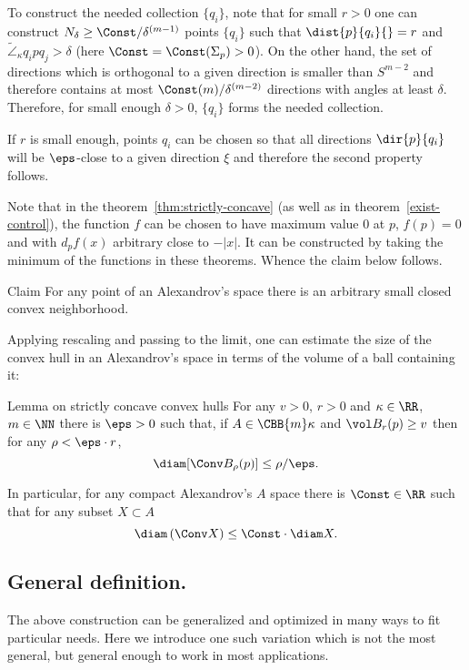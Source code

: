 To construct the needed collection $\{q_i\}$, note that for small $r>0$ one can
construct $N_\delta\ge \Const/\delta^{(m-1)}$ points $\{q_i\}$ such that $\dist{p}{q_i}{}=r$
and $\tilde\angle_\kappa q_i p q_j>\delta$ (here $\Const=\Const(\Sigma_p)>0$).
On the other hand, the set of directions which is orthogonal to a given direction
is smaller than $S^{m-2}$ and therefore contains at most
$\Const(m)/\delta^{(m-2)}$ directions with angles at least $\delta$. 
Therefore, for small enough $\delta>0$, $\{q_i\}$ forms the needed collection.

If $r$ is small enough, points $q_i$ can be chosen so that all directions
$\dir{p}{q_i}$ will be $\eps$-close to a given direction $\xi$ and
therefore the second property follows.
\qeds

Note that in the theorem~\ref{thm:strictly-concave} (as well as in
theorem~\ref{exist-control}), the function $f$ can be chosen to have maximum value $0$ at $p$,
$f(p)=0$ and with $d_p f(x)$ arbitrary close to $-|x|$.
It can be constructed by taking the minimum of the functions in these theorems. Whence the claim below follows.


\begin{thm}{Claim}\label{cor:convex-nbhd}
For any point of an Alexandrov's space there is an arbitrary small closed convex
neighborhood.
\end{thm}

Applying rescaling and passing to the limit, 
one can estimate the size of the convex
hull in an Alexandrov's space in terms of the volume of a ball containing it:

\begin{thm}{Lemma on strictly concave convex hulls
\cite[4.3]{perelman-petrunin:extremal}}
For any $v>0$, $r>0$ and $\kappa\in \RR$, $m\in\NN$ there is $\eps>0$ such that,
if $A\in\CBB{m}\kappa$ and $\vol B_{r}(p)\ge v$ then for any $\rho<\eps\cdot r$, 
$$\diam[\Conv B_\rho(p)]\le \rho/\eps.$$

In particular, for any compact Alexandrov's $A$ space there is $\Const\in \RR$ such that for
any subset $X\subset A$
$$\diam \left(\Conv X \right)\le \Const\cdot\diam X.$$
\end{thm}





\subsection{General definition.} 
The above construction can be generalized and optimized in many ways to fit
particular needs. 
Here we introduce one such variation which is not the most general, but general
enough to work in most applications.

